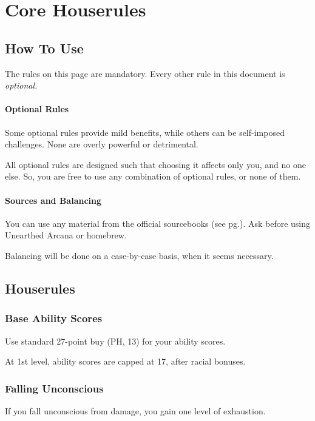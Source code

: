 \documentclass[letterpaper,twocolumn,openany,nodeprecatedcode]{dndbook}
\newcommand{\pg}[1]{pg.\pageref{#1}}
\newcommand{\see}[1]{(see \pg{#1})}
\begin{document}




\chapter{Core Houserules}

\noindent [Version 7.4.3]

\section{How To Use}
The rules on this page are mandatory. Every other rule in this document is \textit{optional.} 

\subsubsection{Optional Rules}
Some optional rules provide mild benefits, while others can be self-imposed challenges. None are overly powerful or detrimental. 

All optional rules are designed such that choosing it affects only you, and no one else. So, you are free to use any combination of optional rules, or none of them.

\subsubsection{Sources and Balancing}
You can use any material from the official sourcebooks \see{sources}. Ask before using Unearthed Arcana or homebrew.

Balancing will be done on a case-by-case basis, when it seems necessary. 

\newpage
\section{Houserules}

\subsection{Base Ability Scores}
Use standard 27-point buy (PH, 13) for your ability scores. 

At 1st level, ability scores are capped at 17, after racial bonuses.

\subsection{Falling Unconscious}
If you fall unconscious from damage, you gain one level of exhaustion.
\end{document}
